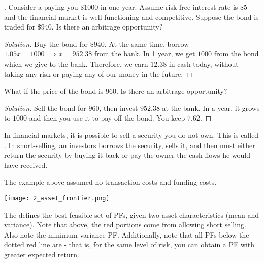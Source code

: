 \documentclass[12pt]{scrartcl}
\begin{document}
\begin{example}
  . Consider a 
  paying you $\$1000$ in one year. Assume risk-free interest rate is 
  $\$5$ and the financial market is well functioning and competitive. Suppose 
  the bond is traded for $\$940$. Is there an arbitrage opportunity? 

  \begin{proof}[Solution]
    Buy the bond for $\$940$. At the same time, borrow $1.05x = 1000 \implies x = 952.38$
    from the bank. In 1 year, we get $1000$ from the bond which we give to the bank. Therefore, 
    we earn $12.38$ in cash today, without taking any risk or paying any of our money 
    in the future.
  \end{proof}

  What if the price of the bond is $960$. Is there an arbitrage opportunity?

  \begin{proof}[Solution]
    Sell the bond for $960$, then invest $952.38$ at the bank. In a year, it grows to 
    $1000$ and then you use it to pay off the bond. You keep $7.62$.
  \end{proof}
\end{example}

\begin{definition}
  In financial markets, it is possible to sell a security you do not own. This is called 
  . In short-selling, an investors borrows the security, sells it, and then 
  must either return the security by buying it back or pay the owner the cash flows 
  he would have received.
\end{definition}

\begin{note}
  The example above assumed no transaction costs and funding costs.
\end{note}

\texttt{[image: 2\_asset\_frontier.png]}

\begin{definition}
  The  defines the best feasible set of PFs, given two 
  asset characteristics (mean and variance). Note that above, the red portions come 
  from allowing short selling. Also note the minimum variance PF. Additionally, note that 
  all PFs below the dotted red line are  - that is, for the same 
  level of risk, you can obtain a PF with greater expected return.
\end{definition}
\end{document}
